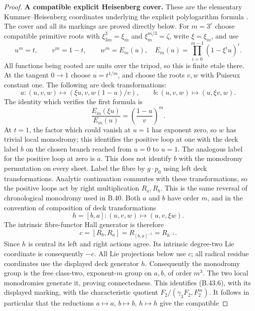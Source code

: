 \begin{proof}
\par\smallskip\noindent\textbf{A compatible explicit Heisenberg cover.}
These are the elementary Kummer--Heisenberg coordinates
underlying the explicit polylogarithm formula
\citep[Section~14.2, proof of Lemma~14.2.3,
(14.2.4)--(14.2.5)]{BWojtkowiak2005III}. The cover and
all its markings are proved directly below.
For $m=3^r$ choose compatible primitive roots with
$\xi_{3m}^3=\xi_m$ and $\xi_m^{m/3}=\zeta$, write
$\xi=\xi_m$, and use
\[
 u^m=t,\qquad v^m=1-t,\qquad
 w^m=E_m(u),\quad
 E_m(u)=\prod_{i=0}^{m-1}(1-\xi^iu)^i.                     \tag{B.43.6}
\]
All functions being rooted are units over the tripod, so
this is finite etale there.  At the tangent $0\!\to\!1$
choose $u=t^{1/m}$, and choose the roots $v,w$ with
Puiseux constant one.  The following are deck transformations:
\[
 a:(u,v,w)\mapsto(\xi u,v,w(1-u)/v),\qquad
 b:(u,v,w)\mapsto(u,\xi v,w).                              \tag{B.43.7}
\]
The identity which verifies the first formula is
\[
 \frac{E_m(\xi u)}{E_m(u)}
       =\left(\frac{1-u}{v}\right)^m.                     \tag{B.43.8}
\]
At $t=1$, the factor which could vanish at $u=1$ has
exponent zero, so $w$ has trivial local monodromy; this
identifies the positive loop at one with the deck label
$b$ on the chosen branch reached from $u=0$ to $u=1$.
The analogous label for the positive loop at zero is $a$.
This does not identify $b$ with the monodromy permutation
on every sheet.  Label the fibre by $g\cdot p_0$ using
left deck transformations.  Analytic continuation commutes
with these transformations, so the positive loops act by
right multiplication $R_a,R_b$.  This is the same reversal
of chronological monodromy used in B.40.
Both $a$ and $b$ have order $m$, and in the convention of
composition of deck transformations
\[
 h=[b,a]:(u,v,w)\mapsto(u,v,\xi w).                        \tag{B.43.9}
\]
The intrinsic fibre-functor Hall generator is therefore
\[
 c=[R_b,R_a]=R_{[b,a]^{-1}}=R_{h^{-1}}.                     \tag{B.43.9a}
\]
Since $h$ is central its left and right actions agree.
Its intrinsic degree-two Lie coordinate is consequently
$-c$. All Lie projections below use $c$; all radical
residue coordinates use the displayed deck generator $h$.
Consequently the monodromy group is the free class-two,
exponent-$m$ group on $a,b$, of order $m^3$.
The two local monodromies generate it, proving connectedness.
This identifies (B.43.6), with its displayed marking, with
the characteristic quotient
$F_2/(\gamma_3F_2,F_2^m)$.
It follows in particular that the reductions
$a\mapsto a$, $b\mapsto b$, $h\mapsto h$ give the compatible

\end{proof}
